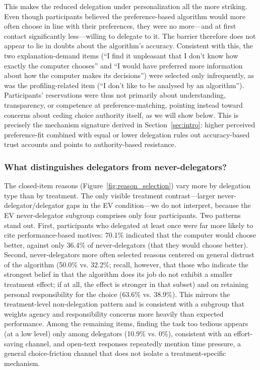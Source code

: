 \documentclass[a4paper, 12pt, fleqn]{article}
\theoremstyle{definition}
\begin{document}
This makes the reduced delegation under personalization all the more striking. Even though participants believed the preference-based algorithm would more often choose in line with their preferences, they were no more---and at first contact significantly less---willing to delegate to it. The barrier therefore does not appear to lie in doubts about the algorithm's accuracy. Consistent with this, the two explanation-demand items (``I find it unpleasant that I don't know how exactly the computer chooses'' and ``I would have preferred more information about how the computer makes its decisions'') were selected only infrequently, as was the profiling-related item (``I don't like to be analysed by an algorithm''). Participants' reservations were thus not primarily about understanding, transparency, or competence at preference-matching, pointing instead toward concerns about ceding choice authority itself, as we will show below. This is precisely the mechanism signature derived in Section~\ref{sec:intro}: higher perceived preference-fit combined with equal or lower delegation rules out accuracy-based trust accounts and points to authority-based resistance.

\subsubsection*{What distinguishes delegators from never-delegators?}
The closed-item reasons (Figure~\ref{fig:reason_selection}) vary more by delegation type than by treatment. The only visible treatment contrast---larger never-delegator/delegator gaps in the EV condition---we do not interpret, because the EV never-delegator subgroup comprises only four participants. Two patterns stand out. First, participants who delegated at least once were far more likely to cite performance-based motives: 70.1\% indicated that the computer would choose better, against only 36.4\% of never-delegators (that they would choose better). Second, never-delegators more often selected reasons centered on general distrust of the algorithm (50.0\% vs. 32.2\%; recall, however, that those who indicate the strongest belief in that the algorithm does its job do not exhibit a smaller treatment effect; if at all, the effect is stronger in that subset) and on retaining personal responsibility for the choice (63.6\% vs. 38.9\%). This mirrors the treatment-level non-delegation pattern and is consistent with a subgroup that weights agency and responsibility concerns more heavily than expected performance. Among the remaining items, finding the task too tedious appears (at a low level) only among delegators (10.9\% vs. 0\%), consistent with an effort-saving channel, and open-text responses repeatedly mention time pressure, a general choice-friction channel that does not isolate a treatment-specific mechanism.
\end{document}
